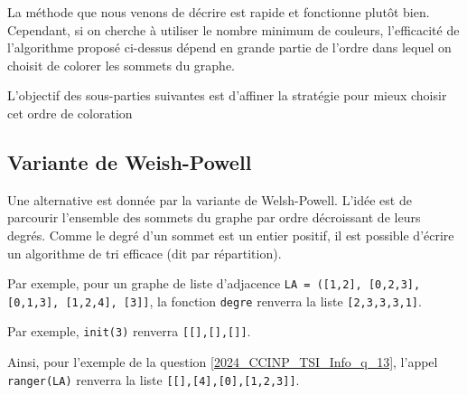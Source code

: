 La méthode que nous venons de décrire est rapide et fonctionne plutôt bien. Cependant, si on cherche à utiliser le nombre minimum de couleurs, l'efficacité de l'algorithme proposé ci-dessus dépend en grande partie de l'ordre dans lequel on choisit de colorer les sommets du graphe. 

L'objectif des sous-parties suivantes est d'affiner la stratégie pour mieux choisir cet ordre de coloration


\subsection{Variante de Weish-Powell}
Une alternative est donnée par la variante de Welsh-Powell. L'idée est de parcourir l'ensemble des sommets du graphe par ordre décroissant de leurs degrés.
Comme le degré d'un sommet est un entier positif, il est possible d'écrire un algorithme de tri efficace (dit par répartition).



Par exemple, pour un graphe de liste d'adjacence \lstinline{LA = ([1,2], [0,2,3], [0,1,3], [1,2,4], [3]]}, la fonction \lstinline{degre} renverra la liste \lstinline{[2,3,3,3,1]}.

\ifprof
\begin{corrige}

\end{corrige}
\else
\fi


Par exemple, \lstinline{init(3)} renverra \lstinline{[[],[],[]]}.

\ifprof
\begin{corrige}

\end{corrige}
\else
\fi


Ainsi, pour l'exemple de la question \ref{2024_CCINP_TSI_Info_q_13}, l'appel \lstinline{ranger(LA)} renverra la liste \lstinline{[[],[4],[0],[1,2,3]]}.

